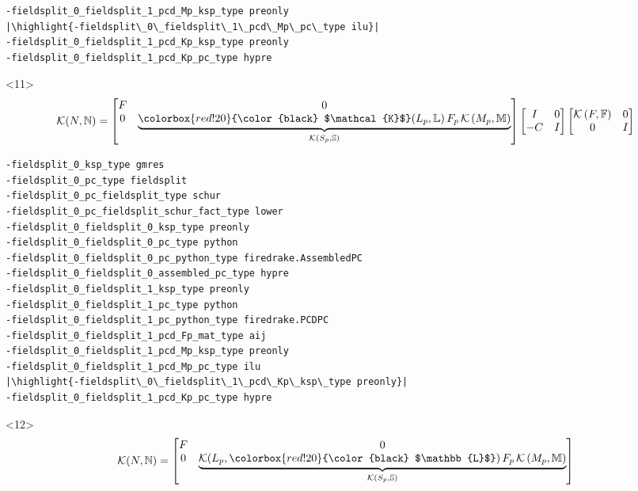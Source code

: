 \documentclass[presentation]{beamer}
\newcommand{\KSP}[2]{\ensuremath{\mathcal{K}\left(#1, \mathbb{#2}\right)}}
\newcommand{\ksp}[1]{\KSP{#1}{#1}}
\newcommand{\highlight}[1]{\colorbox{red!20}{\color{black} #1}}
\begin{document}
\begin{frame}[fragile]
\begin{onlyenv}
\begin{verbatim}
-fieldsplit_0_fieldsplit_1_pcd_Mp_ksp_type preonly
|\highlight{-fieldsplit\_0\_fieldsplit\_1\_pcd\_Mp\_pc\_type ilu}|
-fieldsplit_0_fieldsplit_1_pcd_Kp_ksp_type preonly
-fieldsplit_0_fieldsplit_1_pcd_Kp_pc_type hypre
\end{verbatim}
  \end{onlyenv}
  \begin{onlyenv}<11>
    \color{gray}
    \begin{equation*}
      \mathcal{K}(N, \mathbb{N}) = \begin{bmatrix}
        F & 0 \\
        0 & \underbrace{\highlight{$\mathcal{K}$}(L_p, \mathbb{L})\,F_p \, \KSP{M_p}{M}}_{\KSP{S_p}{S}}
      \end{bmatrix}
      \begin{bmatrix}
        I & 0\\
        -C & I
      \end{bmatrix}
      \begin{bmatrix}
        \ksp{F} & 0 \\
        0 & I
      \end{bmatrix}
    \end{equation*}
\begin{verbatim}
-fieldsplit_0_ksp_type gmres
-fieldsplit_0_pc_type fieldsplit
-fieldsplit_0_pc_fieldsplit_type schur
-fieldsplit_0_pc_fieldsplit_schur_fact_type lower
-fieldsplit_0_fieldsplit_0_ksp_type preonly
-fieldsplit_0_fieldsplit_0_pc_type python
-fieldsplit_0_fieldsplit_0_pc_python_type firedrake.AssembledPC
-fieldsplit_0_fieldsplit_0_assembled_pc_type hypre
-fieldsplit_0_fieldsplit_1_ksp_type preonly
-fieldsplit_0_fieldsplit_1_pc_type python
-fieldsplit_0_fieldsplit_1_pc_python_type firedrake.PCDPC
-fieldsplit_0_fieldsplit_1_pcd_Fp_mat_type aij
-fieldsplit_0_fieldsplit_1_pcd_Mp_ksp_type preonly
-fieldsplit_0_fieldsplit_1_pcd_Mp_pc_type ilu
|\highlight{-fieldsplit\_0\_fieldsplit\_1\_pcd\_Kp\_ksp\_type preonly}|
-fieldsplit_0_fieldsplit_1_pcd_Kp_pc_type hypre
\end{verbatim}
  \end{onlyenv}
  \begin{onlyenv}<12>
    \color{gray}
    \begin{equation*}
      \mathcal{K}(N, \mathbb{N}) = \begin{bmatrix}
        F & 0 \\
        0 & \underbrace{\mathcal{K}(L_p, \highlight{$\mathbb{L}$})\,F_p \, \KSP{M_p}{M}}_{\KSP{S_p}{S}}
      \end{bmatrix}

\end{equation*}
\end{onlyenv}
\end{frame}
\end{document}
